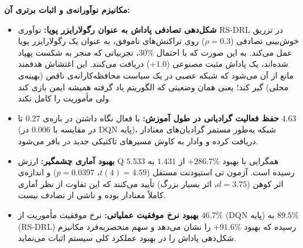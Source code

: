 \documentclass[oneside,openany,a4paper,12pt]{article}
\begin{document}
\textbf{مکانیزم نوآورانه‌ی  و اثبات برتری آن:}
\begin{itemize}
    \item \textbf{شکل‌دهی تصادفی پاداش به عنوان رگولارایزر پویا:} نوآوری RS-DRL در تزریق خوش‌بینی تصادفی ($\rho=0.3$) روی تراکنش‌های ناموفق، به عنوان یک رگولارایزر پویا عمل می‌کند. به این صورت که با احتمال $30\%$، تجربیاتی که منجر به شکست پهپاد شده‌اند، یک پاداش مثبت مصنوعی ($+1.0$) دریافت می‌کنند. این اغتشاش هدفمند مانع از آن می‌شود که شبکه عصبی در یک سیاست محافظه‌کارانه‌ی ناقص (بهینه‌ی محلی) گیر کند؛ یعنی همان وضعیتی که الگوریتم یاد گرفته همیشه ایمن بازی کند ولی مأموریت را کامل نکند.
    \item \textbf{حفظ فعالیت گرادیانی در طول آموزش:} با فعال نگاه داشتن  در بازه‌ی $0.27$ تا $4.63$ (در مقایسه با $0.006$ در DQN پایه)، شبکه به‌طور مستمر گرادیان‌های معنادار دریافت کرده و وادار به کاوش مسیرهای تاکتیکی جدید در بافر می‌شود.
    \item \textbf{بهبود آماری چشمگیر:} ارزش Q همگرایی با بهبود $+286.7\%$ از $1.431$ به $5.533$ رسیده است. آزمون تی استیودنت مستقل ($t(4) = 4.59$، $p = 0.0397$) و اندازه‌ی اثر کوهن ($d = 3.75$، اثر بسیار بزرگ) تأیید می‌کنند که این تفاوت از نظر آماری کاملاً معنادار بوده و ناشی از تصادف نیست.
    \item \textbf{بهبود نرخ موفقیت عملیاتی:} نرخ موفقیت مأموریت از $46.7\%$ (DQN پایه) به $89.5\%$ (RS-DRL) رسیده که بهبود $+91.6\%$ را نشان می‌دهد و سهم منحصربه‌فرد مکانیزم شکل‌دهی پاداش را در بهبود عملکرد کلی سیستم اثبات می‌نماید.
\end{itemize}
\end{document}
